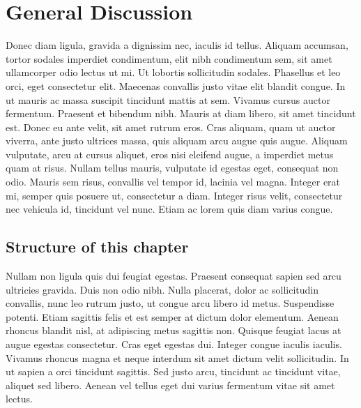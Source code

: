 \chapter{General Discussion}
\label{ch:discussion}
\newpage

Donec diam ligula, gravida a dignissim nec, iaculis id tellus. Aliquam accumsan, tortor sodales imperdiet condimentum, elit nibh condimentum sem, sit amet ullamcorper odio lectus ut mi. Ut lobortis sollicitudin sodales. Phasellus et leo orci, eget consectetur elit. Maecenas convallis justo vitae elit blandit congue. In ut mauris ac massa suscipit tincidunt mattis at sem. Vivamus cursus auctor fermentum. Praesent et bibendum nibh. Mauris at diam libero, sit amet tincidunt est. Donec eu ante velit, sit amet rutrum eros. Cras aliquam, quam ut auctor viverra, ante justo ultrices massa, quis aliquam arcu augue quis augue. Aliquam vulputate, arcu at cursus aliquet, eros nisi eleifend augue, a imperdiet metus quam at risus. Nullam tellus mauris, vulputate id egestas eget, consequat non odio. Mauris sem risus, convallis vel tempor id, lacinia vel magna. Integer erat mi, semper quis posuere ut, consectetur a diam. Integer risus velit, consectetur nec vehicula id, tincidunt vel nunc. Etiam ac lorem quis diam varius congue.
\section{Structure of this chapter}
\label{ch7:structure}
Nullam non ligula quis dui feugiat egestas. Praesent consequat sapien sed arcu ultricies gravida. Duis non odio nibh. Nulla placerat, dolor ac sollicitudin convallis, nunc leo rutrum justo, ut congue arcu libero id metus. Suspendisse potenti. Etiam sagittis felis et est semper at dictum dolor elementum. Aenean rhoncus blandit nisl, at adipiscing metus sagittis non. Quisque feugiat lacus at augue egestas consectetur. Cras eget egestas dui. Integer congue iaculis iaculis. Vivamus rhoncus magna et neque interdum sit amet dictum velit sollicitudin. In ut sapien a orci tincidunt sagittis. Sed justo arcu, tincidunt ac tincidunt vitae, aliquet sed libero. Aenean vel tellus eget dui varius fermentum vitae sit amet lectus.



